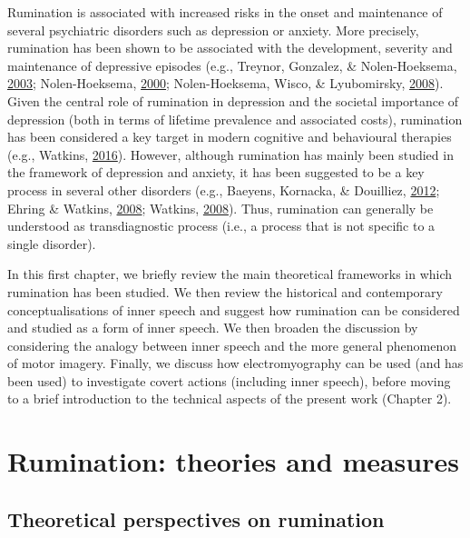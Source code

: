 \documentclass[a4paper,12pt,twoside,openright,oldfontcommands]{memoir}
\begin{document}
Rumination is associated with increased risks in the onset and maintenance of several psychiatric disorders such as depression or anxiety. More precisely, rumination has been shown to be associated with the development, severity and maintenance of depressive episodes (e.g., Treynor, Gonzalez, \& Nolen-Hoeksema, \protect\hyperlink{ref-treynor_rumination_2003}{2003}; Nolen-Hoeksema, \protect\hyperlink{ref-Nolen-Hoeksema2000}{2000}; Nolen-Hoeksema, Wisco, \& Lyubomirsky, \protect\hyperlink{ref-Nolen-Hoeksema2008}{2008}). Given the central role of rumination in depression and the societal importance of depression (both in terms of lifetime prevalence and associated costs), rumination has been considered a key target in modern cognitive and behavioural therapies (e.g., Watkins, \protect\hyperlink{ref-watkins_rumination-focused_2016}{2016}). However, although rumination has mainly been studied in the framework of depression and anxiety, it has been suggested to be a key process in several other disorders (e.g., Baeyens, Kornacka, \& Douilliez, \protect\hyperlink{ref-Baeyens2012}{2012}; Ehring \& Watkins, \protect\hyperlink{ref-ehring_repetitive_2008}{2008}; Watkins, \protect\hyperlink{ref-Watkins2008}{2008}). Thus, rumination can generally be understood as transdiagnostic process (i.e., a process that is not specific to a single disorder).

In this first chapter, we briefly review the main theoretical frameworks in which rumination has been studied. We then review the historical and contemporary conceptualisations of inner speech and suggest how rumination can be considered and studied as a form of inner speech. We then broaden the discussion by considering the analogy between inner speech and the more general phenomenon of motor imagery. Finally, we discuss how electromyography can be used (and has been used) to investigate covert actions (including inner speech), before moving to a brief introduction to the technical aspects of the present work (Chapter 2).

\hypertarget{rumination-theories-and-measures}{%
\section{Rumination: theories and measures}\label{rumination-theories-and-measures}}

\hypertarget{theoretical-perspectives-on-rumination}{%
\subsection{Theoretical perspectives on rumination}\label{theoretical-perspectives-on-rumination}}
\end{document}
